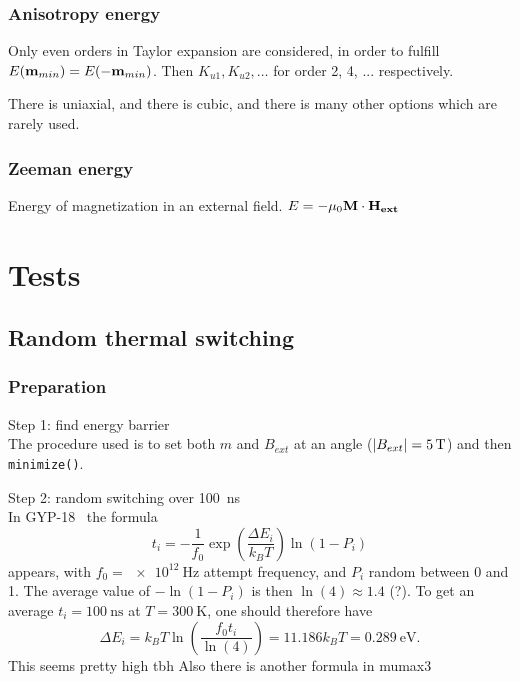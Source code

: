 \documentclass[10pt,a4paper]{article}
\newcommand{\code}[1]{\texttt{#1}}
\begin{document}
	\subsubsection{Anisotropy energy}
	Only even orders in Taylor expansion are considered, in order to fulfill $E(\vb{m}_{min}) = E(-\vb{m}_{min})$. Then $K_{u1}, K_{u2}, \dots$ for order 2, 4, ... respectively.
	
	There is uniaxial, and there is cubic, and there is many other options which are rarely used.
	
	\subsubsection{Zeeman energy}
	Energy of magnetization in an external field.
	$E = -\mu_0 \vb{M} \cdot \vb{H_{ext}}$
	
	\section{Tests}
	\subsection{Random thermal switching}
	\subsubsection{Preparation}
	Step 1: find energy barrier \\
	The procedure used is to set both $m$ and $B_{ext}$ at an angle ($\abs{B_{ext}} = \SI{5}{\tesla}$) and then \code{minimize()}.
	
	Step 2: random switching over \SI{100}{\nano\second} \\
	In GYP-18~\cite{GYP-18} the formula
	\begin{equation}
	    t_i = -\frac{1}{f_0} \exp(\frac{\Delta E_i}{k_B T}) \ln(1-P_i)
	\end{equation}
	appears, with $f_0 = \SI{e12}{\hertz}$ attempt frequency, and $P_i$ random between 0 and 1. The average value of $-\ln(1-P_i)$ is then $\ln(4) \approx 1.4$ (?). To get an average $t_i = \SI{100}{\nano\second}$ at $T=\SI{300}{\kelvin}$, one should therefore have
	\begin{equation}
	    \Delta E_i = k_B T \ln(\frac{f_0 t_i}{\ln(4)}) = 11.186 k_B T = \SI{0.289}{\electronvolt} \mathrm{.}
	\end{equation}
	This seems pretty high tbh
	Also there is another formula in mumax3~\cite{MuMax3}
	
\end{document}
